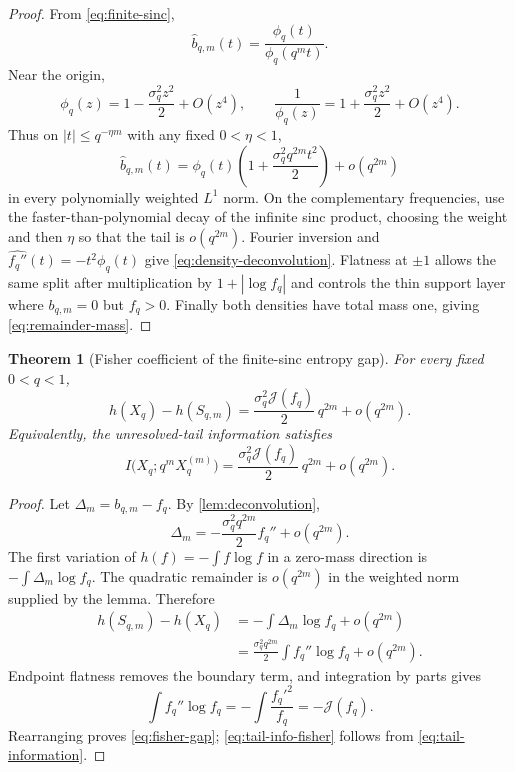 \documentclass[11pt,oneside]{article}
\newtheorem{theorem}{Theorem}[section]
\theoremstyle{definition}
\theoremstyle{remark}
\begin{document}
\begin{proof}
From \eqref{eq:finite-sinc},
\[
 \widehat b_{q,m}(t)=\frac{\phi_q(t)}{\phi_q(q^mt)}.
\]
Near the origin,
\[
 \phi_q(z)=1-\frac{\sigma_q^2z^2}{2}+O(z^4),
 \qquad
 \frac1{\phi_q(z)}=1+\frac{\sigma_q^2z^2}{2}+O(z^4).
\]
Thus on $|t|\le q^{-\eta m}$ with any fixed $0<\eta<1$,
\[
 \widehat b_{q,m}(t)
 =\phi_q(t)\left(1+\frac{\sigma_q^2q^{2m}t^2}{2}
\right)
 +o(q^{2m})
\]
in every polynomially weighted $L^1$ norm.  On the complementary frequencies,
use the faster-than-polynomial decay of the infinite sinc product, choosing the
weight and then $\eta$ so that the tail is $o(q^{2m})$.  Fourier inversion and
$\widehat{f_q''}(t)=-t^2\phi_q(t)$ give
\eqref{eq:density-deconvolution}.  Flatness at $\pm1$ allows the same split after
multiplication by $1+|\log f_q|$ and controls the thin support layer where
$b_{q,m}=0$ but $f_q>0$.  Finally both densities have total mass one, giving
\eqref{eq:remainder-mass}.
\end{proof}

\begin{theorem}[Fisher coefficient of the finite-sinc entropy gap]
\label{thm:fisher-gap}
For every fixed $0<q<1$,
\begin{equation}
 \boxed{
 h(X_q)-h(S_{q,m})
 =\frac{\sigma_q^2\mathcal J(f_q)}{2}\,q^{2m}
 +o(q^{2m}).}
 \label{eq:fisher-gap}
\end{equation}
Equivalently, the unresolved-tail information satisfies
\begin{equation}
 I\bigl(X_q;q^mX_q^{(m)}\bigr)
 =\frac{\sigma_q^2\mathcal J(f_q)}{2}\,q^{2m}
 +o(q^{2m}).
 \label{eq:tail-info-fisher}
\end{equation}
\end{theorem}

\begin{proof}
Let $\Delta_m=b_{q,m}-f_q$.  By \cref{lem:deconvolution},
\[
 \Delta_m=-\frac{\sigma_q^2q^{2m}}2f_q''+o(q^{2m}).
\]
The first variation of $h(f)=-\int f\log f$ in a zero-mass direction is
$-\int\Delta_m\log f_q$.  The quadratic remainder is $o(q^{2m})$ in the weighted
norm supplied by the lemma.  Therefore
\begin{align*}
 h(S_{q,m})-h(X_q)
 &=-\int\Delta_m\log f_q+o(q^{2m})\\
 &=\frac{\sigma_q^2q^{2m}}2\int f_q''\log f_q+o(q^{2m}).
\end{align*}
Endpoint flatness removes the boundary term, and integration by parts gives
\[
 \int f_q''\log f_q=-\int\frac{f_q'^2}{f_q}=-\mathcal J(f_q).
\]
Rearranging proves \eqref{eq:fisher-gap};
\eqref{eq:tail-info-fisher} follows from \eqref{eq:tail-information}.
\end{proof}
\end{document}
